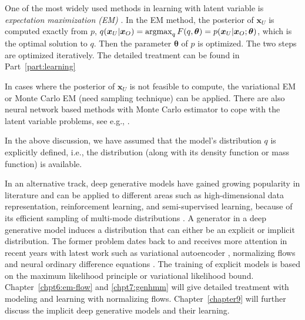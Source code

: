 One of the most widely used methods in learning with latent variable is \textit{expectation maximization (EM)} \cite{dempster1977maximum}. In the EM method, the posterior of $\bm{x}_U$ is computed exactly from $p$, $q(\bm{x}_U|\bm{x}_O) = \operatorname{argmax}_{q}{F(q, \bm{\theta})} = p(\bm{x}_U|\bm{x}_O; \bm{\theta})$, which is the optimal solution to $q$. Then the parameter $\bm{\theta}$ of $p$ is optimized. The two steps are optimized iteratively. The detailed treatment can be found in Part~\ref{part:learning}

In cases where the posterior of $\bm{x}_U$ is not feasible to compute, the variational EM \cite[Section~6.2.2]{wainwright2008graphical} or Monte Carlo EM (need sampling technique) \cite{neath2012convergence} can be applied. There are also neural network based methods with Monte Carlo estimator to cope with the latent variable problems, see e.g., \cite{DBLP:journals/corr/KingmaW13, kuleshov2017neural_variational, lazarogredilla2019learning, goodfellow2014gan}.


In the above discussion, we have assumed that the model's distribution $q$ is explicitly defined, i.e., the distribution (along with its density function or mass function) is available. 

In an alternative track, deep generative models have gained growing popularity in literature and can be applied to different areas such as high-dimensional data representation, reinforcement learning, and semi-supervised learning, because of its efficient sampling of multi-mode distributions \cite{2017arXiv170100160G}. A generator in a deep generative model induces a distribution that can either be an explicit or implicit distribution. The former problem dates back to \cite{deco1995high-order} and receives more attention in recent years with latest work such as variational autoencoder \cite{DBLP:journals/corr/KingmaW13}, normalizing flows \cite{2016arXiv160508803D, 2018arXiv180703039K} and neural ordinary difference equations \cite{ricky2018ODE}. The training of explicit models is based on the maximum likelihood principle or variational likelihood bound. Chapter~\ref{chpt6:em-flow} and \ref{chpt7:genhmm} will give detailed treatment with modeling and learning with normalizing flows. Chapter~\ref{chapter9} will further discuss the implicit deep generative models and their learning.

